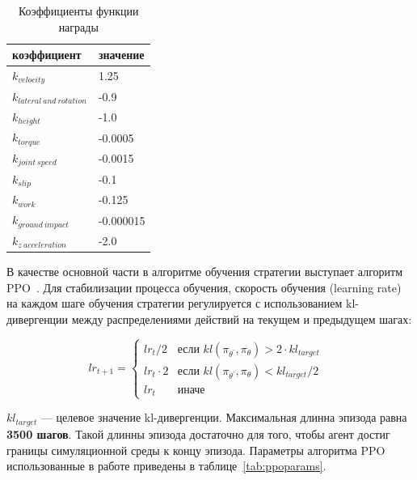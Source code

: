 \begin{table} [htbp]
    \centering
    \begin{threeparttable}
        \caption{Коэффициенты функции награды}\label{tab:rcoeff}
        \begin{tabular}{| p{8cm} || p{8cm} |}
            \hline
            \hline
            коэффициент & значение \\
            \hline
            $k_{velocity}$ &	1.25 \\
            $k_{lateral\ and\ rotation}$ &	-0.9 \\
            $k_{height}$	& -1.0 \\
            $k_{torque}$	& -0.0005 \\ 
            $k_{joint\ speed}$ &	-0.0015 \\
            $k_{slip}$ &	-0.1 \\
            $k_{work}$ &	-0.125 \\
            $k_{ground\ impact}$ &	-0.000015 \\
            $k_{z\ acceleration}$ &	-2.0 \\
            \hline
            \hline
        \end{tabular}
    \end{threeparttable}
\end{table}


В качестве основной части в алгоритме обучения стратегии выступает алгоритм PPO~\cite{Schulman2017ProximalPO}. Для стабилизации процесса обучения, скорость обучения (learning rate) на каждом шаге обучения стратегии регулируется с использованием kl-дивергенции между распределениями действий на текущем и предыдущем шагах:

\begin{equation}
  lr_{t+1} =
    \begin{cases}
      lr_t / 2 & \text{если $kl(\pi_{\theta^{\prime}}, \pi_{\theta}) > 2 \cdot kl_{target}$ }\\
      lr_t \cdot 2 & \text{если $kl(\pi_{\theta^{\prime}}, \pi_{\theta}) < kl_{target} / 2$ }\\
      lr_t & \text{иначе}
    \end{cases}     
\end{equation}

$kl_{target}$ --- целевое значение kl-дивергенции. Максимальная длинна эпизода равна \textbf{3500 шагов}. Такой длинны эпизода достаточно для того, чтобы агент достиг границы симуляционной среды к концу эпизода. Параметры алгоритма PPO использованные в работе приведены в таблице~\ref{tab:ppoparams}.

